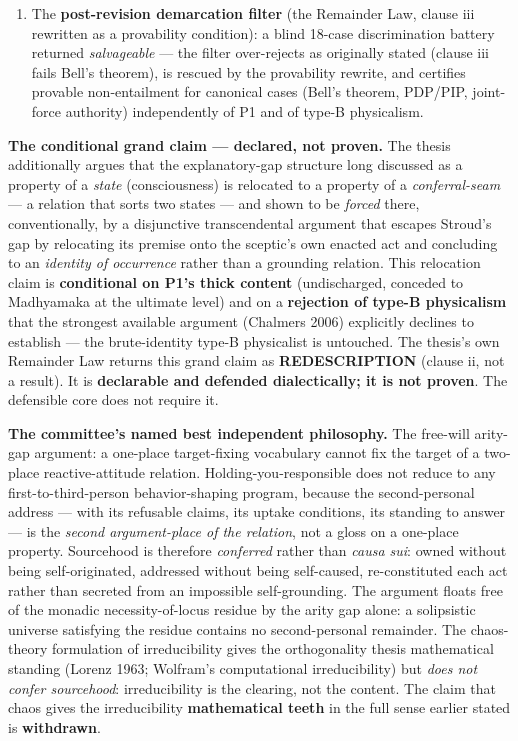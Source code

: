 \documentclass[11pt]{article}
\begin{document}
\begin{enumerate}
\item The \textbf{post-revision demarcation filter} (the Remainder Law, clause iii rewritten as a provability condition): a blind 18-case discrimination battery returned \emph{salvageable} — the filter over-rejects as originally stated (clause iii fails Bell's theorem), is rescued by the provability rewrite, and certifies provable non-entailment for canonical cases (Bell's theorem, PDP/\allowbreak{}PIP, joint-force authority) independently of P1 and of type-B physicalism.
\end{enumerate}

\textbf{The conditional grand claim — declared, not proven.} The thesis additionally argues that the explanatory-gap structure long discussed as a property of a \emph{state} (consciousness) is relocated to a property of a \emph{conferral-seam} — a relation that sorts two states — and shown to be \emph{forced} there, conventionally, by a disjunctive transcendental argument that escapes Stroud's gap by relocating its premise onto the sceptic's own enacted act and concluding to an \emph{identity of occurrence} rather than a grounding relation. This relocation claim is \textbf{conditional on P1's thick content} (undischarged, conceded to Madhyamaka at the ultimate level) and on a \textbf{rejection of type-B physicalism} that the strongest available argument (Chalmers 2006) explicitly declines to establish — the brute-identity type-B physicalist is untouched. The thesis's own Remainder Law returns this grand claim as \textbf{REDESCRIPTION} (clause ii, not a result). It is \textbf{declarable and defended dialectically; it is not proven}. The defensible core does not require it.

\textbf{The committee's named best independent philosophy.} The free-will arity-gap argument: a one-place target-fixing vocabulary cannot fix the target of a two-place reactive-attitude relation. Holding-you-responsible does not reduce to any first-to-third-person behavior-shaping program, because the second-personal address — with its refusable claims, its uptake conditions, its standing to answer — is the \emph{second argument-place of the relation}, not a gloss on a one-place property. Sourcehood is therefore \emph{conferred} rather than \emph{causa sui}: owned without being self-originated, addressed without being self-caused, re-constituted each act rather than secreted from an impossible self-grounding. The argument floats free of the monadic necessity-of-locus residue by the arity gap alone: a solipsistic universe satisfying the residue contains no second-personal remainder. The chaos-theory formulation of irreducibility gives the orthogonality thesis mathematical standing (Lorenz 1963; Wolfram's computational irreducibility) but \emph{does not confer sourcehood}: irreducibility is the clearing, not the content. The claim that chaos gives the irreducibility \textbf{mathematical teeth} in the full sense earlier stated is \textbf{withdrawn}.
\end{document}
